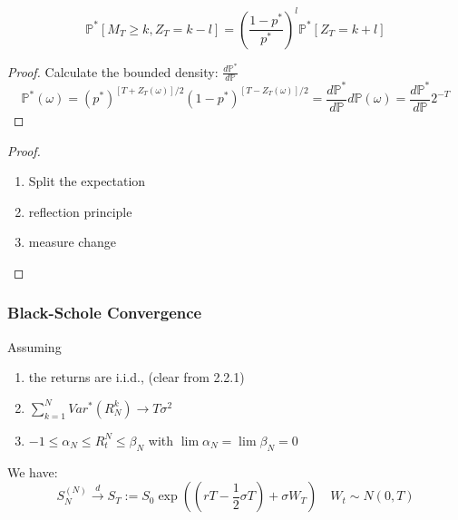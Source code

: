 \begin{theorem}
\begin{equation*}
	\mathbb{P}^*[M_T \geq k, Z_T = k - l] = \left( \frac{1-p^*}{p^*} \right)^l \mathbb{P}^*[Z_T = k + l]
\end{equation*}
\end{theorem}
\begin{proof}
	Calculate the bounded density: $\frac{d\mathbb{P}^*}{d\mathbb{P}}$
	\begin{equation*}
		\mathbb{P}^*(\omega) = (p^*)^{[T + Z_T(\omega)]/2}(1-p^*)^{[T - Z_T(\omega)]/2} = \frac{d\mathbb{P}^*}{d\mathbb{P}} d\mathbb{P}(\omega) = \frac{d\mathbb{P}^*}{d\mathbb{P}} 2^{-T} 
	\end{equation*}
\end{proof}

\begin{theorem}
\end{theorem}
\begin{proof} \quad
	\begin{enumerate}
		\item Split the expectation
		\item reflection principle
		\item measure change
	\end{enumerate}
\end{proof}

\subsubsection*{Black-Schole Convergence}
\begin{lemma}
\end{lemma}

\begin{lemma}
\end{lemma}

\begin{theorem}
Assuming
\begin{enumerate}
	\item the returns are i.i.d., (clear from 2.2.1)
	\item $\sum_{k = 1}^N Var^*(R_N^k) \rightarrow T\sigma^2$
	\item $-1 \leq \alpha_N \leq R^N_t \leq \beta_N$ with $\lim \alpha_N = \lim \beta_N = 0$
\end{enumerate}
We have:
\begin{equation*}
	S^{(N)}_{N} \overset{d}{\longrightarrow} S_T:= S_0\exp\left((rT - \frac{1}{2}\sigma T) + \sigma W_T \right) \quad W_t \sim N(0, T) 
\end{equation*}
\end{theorem}

